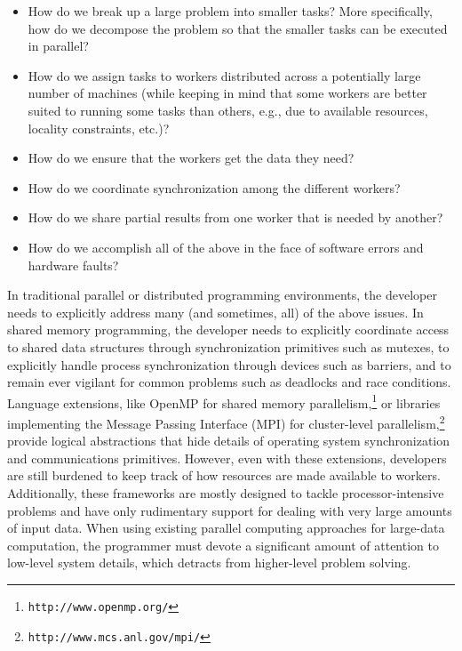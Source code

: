 \documentclass[11pt]{article}
\begin{document}
\begin{itemize}

\item How do we break up a large problem into smaller tasks?  
  More specifically, how do we decompose the problem so that the
  smaller tasks can be executed in parallel?

\item How do we assign tasks to workers distributed across a
  potentially large number of machines (while keeping in mind that
  some workers are better suited to running some tasks than others,
  e.g., due to available resources, locality constraints, etc.)?

\item How do we ensure that the workers get the data they need?

\item How do we coordinate synchronization among the different
  workers?

\item How do we share partial results from one worker that is needed
  by another?

\item How do we accomplish all of the above in the face of software
  errors and hardware faults?

\end{itemize}

In traditional parallel or distributed programming environments, the
developer needs to explicitly address many (and sometimes, all) of the
above issues.  In shared memory programming, the developer needs to
explicitly coordinate access to shared data structures through
synchronization primitives such as mutexes, to explicitly handle
process synchronization through devices such as barriers, and to
remain ever vigilant for common problems such as deadlocks and race
conditions.  Language extensions, like OpenMP for shared memory
parallelism,\footnote{\texttt{http://www.openmp.org/}} or libraries
implementing the Message Passing Interface (MPI) for cluster-level
parallelism,\footnote{\texttt{http://www.mcs.anl.gov/mpi/}} provide logical
abstractions that hide details of operating system synchronization and
communications primitives.  However, even with these extensions,
developers are still burdened to keep track of how resources are made
available to workers.  Additionally, these frameworks are mostly
designed to tackle processor-intensive problems and have only
rudimentary support for dealing with very large amounts of input data.
When using existing parallel computing approaches for large-data
computation, the programmer must devote a significant amount of
attention to low-level system details, which detracts from
higher-level problem solving.
\end{document}
